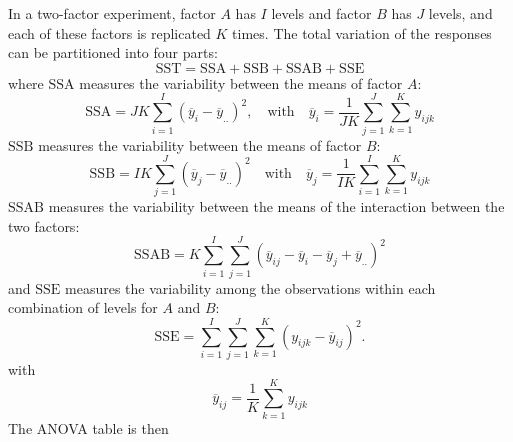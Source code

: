 \documentclass{article}
\begin{document}
In a two-factor experiment, factor \(A\) has \(I\) levels and factor \(B\) has \(J\) levels, and
each of these factors is replicated \(K\) times. The total variation of the responses can be partitioned
into four parts:
\begin{equation*}
    \mathrm{SST} = \mathrm{SSA} + \mathrm{SSB} + \mathrm{SSAB} + \mathrm{SSE}
\end{equation*}
where \(\mathrm{SSA}\) measures the variability between the means of factor \(A\):
\begin{equation*}
    \mathrm{SSA} = JK \sum_{i = 1}^I \left( \overline{y}_i - \overline{y}_{..} \right)^2, \quad \text{with} \quad  \overline{y}_i = \frac{1}{JK} \sum_{j = 1}^J \sum_{k = 1}^K y_{ijk}
\end{equation*}
\(\mathrm{SSB}\) measures the variability between the means of factor \(B\):
\begin{equation*}
    \mathrm{SSB} = IK \sum_{j = 1}^J \left( \overline{y}_j - \overline{y}_{..} \right)^2 \quad \text{with} \quad \overline{y}_j = \frac{1}{IK} \sum_{i = 1}^I \sum_{k = 1}^K y_{ijk}
\end{equation*}
\(\mathrm{SSAB}\) measures the variability between the means of the interaction between the two factors:
\begin{equation*}
    \mathrm{SSAB} = K \sum_{i = 1}^I \sum_{j = 1}^J \left( \overline{y}_{ij} - \overline{y}_i - \overline{y}_j + \overline{y}_{..} \right)^2
\end{equation*}
and \(\mathrm{SSE}\) measures the variability among the observations within each combination of levels for \(A\) and \(B\):
\begin{equation*}
    \mathrm{SSE} = \sum_{i = 1}^I \sum_{j = 1}^J \sum_{k = 1}^K \left( y_{ijk} - \overline{y}_{ij} \right)^2.
\end{equation*}
with
\begin{equation*}
    \overline{y}_{ij} = \frac{1}{K} \sum_{k = 1}^K y_{ijk}
\end{equation*}
The ANOVA table is then
\end{document}
